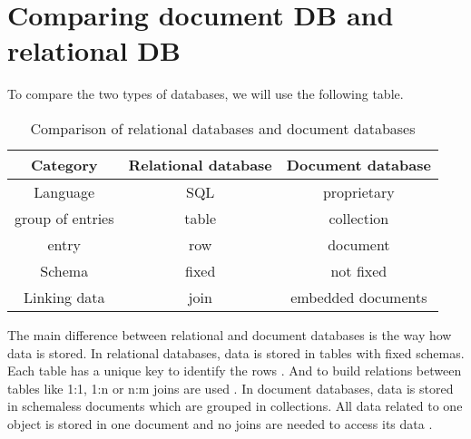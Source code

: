 
\section{Comparing document DB and relational DB}

To compare the two types of databases, we will use the following table.

\begin{table}[H]
    \centering
    \begin{adjustbox}{width=1\textwidth}
        \begin{tabular}{c|c|c}
            \textbf{Category} & \textbf{Relational database}    & \textbf{Document database} \\ \hline \hline
            Language          & SQL                             & proprietary                \\ 
            group of entries  & table                           & collection                 \\ 
            entry             & row                             & document                   \\ 
            Schema            & fixed                           & not fixed                  \\ 
            Linking data      & join                            & embedded documents         \\ 
        \end{tabular}
    \end{adjustbox}
    \caption{Comparison of relational databases and document databases \parencites[p. 91]{chauhan2019review}{Relational-vs-Document}}
    \label{tab:document-relational-comparison}
\end{table}
\color{black}

The main difference between relational and document databases is the way how data is stored. 
In relational databases, data is stored in tables with fixed schemas. Each table has a unique key to identify the rows \parencites[p. 91]{chauhan2019review}{Relational-vs-Document}. 
And to build relations between tables like 1:1, 1:n or n:m joins are used \parencite[pp. 25-31]{Studer2019}.
In document databases, data is stored in schemaless documents which are grouped in collections.
All data related to one object is stored in one document and no joins are needed to access its data \parencite[pp. 18-20]{Meier2016}.
